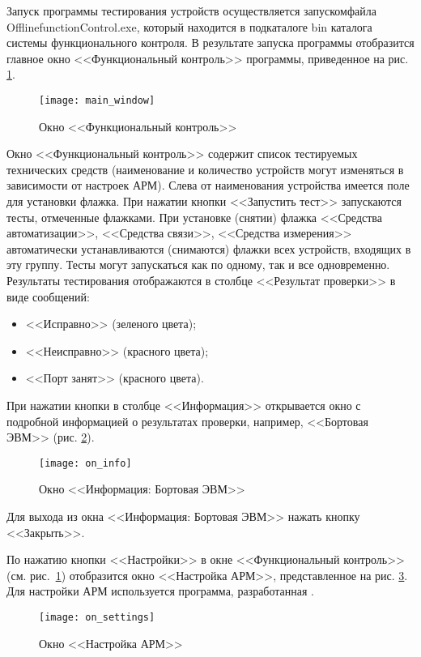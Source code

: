 Запуск программы тестирования устройств
осуществляется запуском\break файла OfflinefunctionControl.exe, который находится в
подкаталоге bin каталога системы функционального контроля.
В результате запуска программы отобразится главное окно <<Функциональный контроль>> программы, приведенное на рис.
\ref{fig:guide:user_guide:func:main_window}.
\begin{figure}[htb]
	\centering
	\texttt{[image: main\_window]}
	\caption{Окно <<Функциональный контроль>>}
	\label{fig:guide:user_guide:func:main_window}
\end{figure}

Окно <<Функциональный контроль>> содержит список тестируемых технических средств
(наименование и количество устройств могут изменяться в зависимости от настроек АРМ).
Слева от наименования устройства имеется поле для установки флажка.
При нажатии кнопки <<Запустить тест>> запускаются тесты, отмеченные флажками.
При установке (снятии) флажка <<Средства автоматизации>>, <<Средства связи>>,
<<Средства измерения>> автоматически
устанавливаются (снимаются) флажки всех устройств, входящих в эту группу.
Тесты могут запускаться как по одному, так и все одновременно.
Результаты тестирования отображаются в столбце <<Результат проверки>> в виде сообщений:
\begin{itemize}
		\item <<Исправно>> (зеленого цвета);
		\item <<Неисправно>> (красного цвета);
		\item <<Порт занят>> (красного цвета).
\end{itemize}

При нажатии кнопки в столбце <<Информация>> открывается окно с подробной информацией о результатах проверки,
например, <<Бортовая ЭВМ>> (рис. \ref{fig:guide:user_guide:func:on_info}).
\begin{figure}
	\centering
	\texttt{[image: on\_info]}
	\caption{Окно <<Информация: Бортовая ЭВМ>>}
	\label{fig:guide:user_guide:func:on_info}
\end{figure}
Для выхода из окна <<Информация: Бортовая ЭВМ>> нажать кнопку <<Закрыть>>.

По нажатию кнопки <<Настройки>> в окне <<Функциональный контроль>> (см.
рис.~\ref{fig:guide:user_guide:func:main_window}) отобразится окно <<Настройка АРМ>>, представленное на рис.
\ref{fig:guide:user_guide:func:on_settings}. Для настройки АРМ используется
программа, разработанная \company.
\begin{figure}
	\centering
	\texttt{[image: on\_settings]}
	\caption{Окно <<Настройка АРМ>>}
	\label{fig:guide:user_guide:func:on_settings}
\end{figure}

